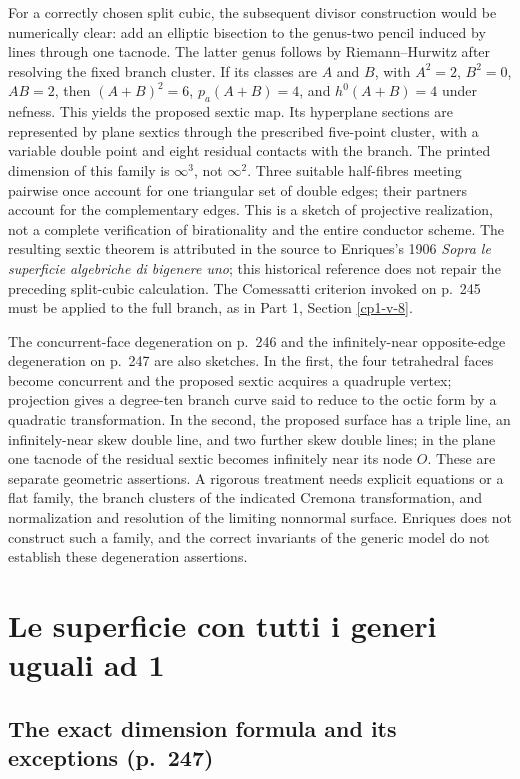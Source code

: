 For a correctly chosen split cubic, the subsequent divisor construction would be numerically clear: add an elliptic bisection to the genus-two pencil induced by lines through one tacnode. The latter genus follows by Riemann--Hurwitz after resolving the fixed branch cluster. If its classes are \(A\) and \(B\), with \(A^2=2\), \(B^2=0\), \(AB=2\), then \((A+B)^2=6\), \(p_a(A+B)=4\), and \(h^0(A+B)=4\) under nefness. This yields the proposed sextic map. Its hyperplane sections are represented by plane sextics through the prescribed five-point cluster, with a variable double point and eight residual contacts with the branch. The printed dimension of this family is \(\infty^3\), not \(\infty^2\). Three suitable half-fibres meeting pairwise once account for one triangular set of double edges; their partners account for the complementary edges. This is a sketch of projective realization, not a complete verification of birationality and the entire conductor scheme. The resulting sextic theorem is attributed in the source to Enriques's 1906 \emph{Sopra le superficie algebriche di bigenere uno}; this historical reference does not repair the preceding split-cubic calculation. The Comessatti criterion invoked on p.~245 must be applied to the full branch, as in Part 1, Section \ref{cp1-v-8}.

The concurrent-face degeneration on p.~246 and the infinitely-near opposite-edge degeneration on p.~247 are also sketches. In the first, the four tetrahedral faces become concurrent and the proposed sextic acquires a quadruple vertex; projection gives a degree-ten branch curve said to reduce to the octic form by a quadratic transformation. In the second, the proposed surface has a triple line, an infinitely-near skew double line, and two further skew double lines; in the plane one tacnode of the residual sextic becomes infinitely near its node \(O\). These are separate geometric assertions. A rigorous treatment needs explicit equations or a flat family, the branch clusters of the indicated Cremona transformation, and normalization and resolution of the limiting nonnormal surface. Enriques does not construct such a family, and the correct invariants of the generic model do not establish these degeneration assertions.

\section{Le superficie con tutti i generi uguali ad 1}\label{cp2-vii-2}

\subsection{The exact dimension formula and its exceptions (p.~247)}\label{cp2-vii-2-1}

